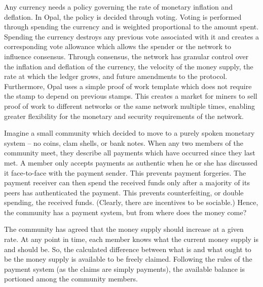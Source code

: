 \documentclass[10pt,twocolumn]{article}
\begin{document}
Any currency needs a policy governing the rate of monetary inflation and deflation.  In Opal, the policy is decided through voting.  Voting is performed through spending the currency and is weighted proportional to the amount spent.  Spending the currency destroys any previous vote associated with it and creates a corresponding vote allowance which allows the spender or the network to influence consensus.  Through consensus, the network has granular control over the inflation and deflation of the currency, the velocity of the money supply, the rate at which the ledger grows, and future amendments to the protocol.  Furthermore, Opal uses a simple proof of work template which does not require the stamp to depend on previous stamps.  This creates a market for miners to sell proof of work to different networks or the same network multiple times, enabling greater flexibility for the monetary and security requirements of the network. 

Imagine a small community which decided to move to a purely spoken monetary system -- no coins, clam shells, or bank notes.  When any two members of the community meet, they describe all payments which have occurred since they last met.  A member only accepts payments as authentic when he or she has discussed it face-to-face with the payment sender.  This prevents payment forgeries.  The payment receiver can then spend the received funds only after a majority of its peers has authenticated the payment.  This prevents counterfeiting, or double spending, the received funds.  (Clearly, there are incentives to be sociable.)  Hence, the community has a payment system, but from where does the money come?

The community has agreed that the money supply should increase at a given rate.  At any point in time, each member knows what the current money supply is and should be.  So, the calculated difference between what is and what ought to be the money supply is available to be freely claimed.  Following the rules of the payment system (as the claims are simply payments), the available balance is portioned among the community members.
\end{document}
